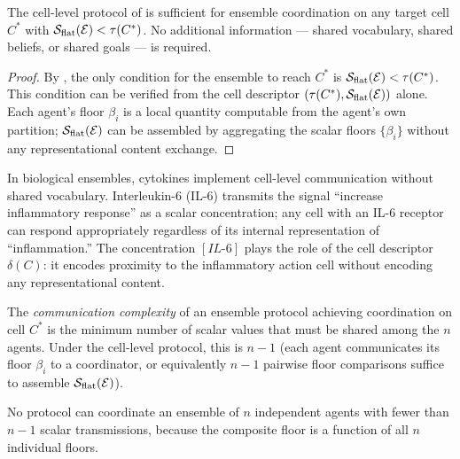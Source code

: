 \begin{proposition}
\label{prop:sufficient-communication}
The cell-level protocol of  is sufficient for
ensemble coordination on any target cell $C^*$ with $\mathcal{S}_{\mathrm{flat}}(\mathcal{E}) <
\tau(C^*)$.  No additional information — shared vocabulary, shared beliefs, or
shared goals — is required.
\end{proposition}

\begin{proof}
By , the only condition for the ensemble to reach
$C^*$ is $\mathcal{S}_{\mathrm{flat}}(\mathcal{E}) < \tau(C^*)$.  This condition can be
verified from the cell descriptor $(\tau(C^*), \mathcal{S}_{\mathrm{flat}}(\mathcal{E}))$
alone.  Each agent's floor $\beta_i$ is a local quantity computable from the
agent's own partition; $\mathcal{S}_{\mathrm{flat}}(\mathcal{E})$ can be assembled by
aggregating the scalar floors $\{\beta_i\}$ without any representational
content exchange.
\end{proof}

\begin{remark}
\label{rem:cytokine}
In biological ensembles, cytokines implement cell-level communication without
shared vocabulary.  Interleukin-6 (IL-6) transmits the signal ``increase
inflammatory response'' as a scalar concentration; any cell with an IL-6
receptor can respond appropriately regardless of its internal representation
of ``inflammation.''  The concentration $[IL\text{-}6]$ plays the role of the
cell descriptor $\delta(C)$: it encodes proximity to the inflammatory action
cell without encoding any representational content.
\end{remark}

\begin{definition}
\label{def:comm-complexity}
The \emph{communication complexity} of an ensemble protocol achieving
coordination on cell $C^*$ is the minimum number of scalar values that must
be shared among the $n$ agents.  Under the cell-level protocol, this is
$n - 1$ (each agent communicates its floor $\beta_i$ to a coordinator, or
equivalently $n-1$ pairwise floor comparisons suffice to assemble
$\mathcal{S}_{\mathrm{flat}}(\mathcal{E})$).
\end{definition}

\begin{proposition}
\label{prop:comm-lower-bound}
No protocol can coordinate an ensemble of $n$ independent agents with fewer
than $n - 1$ scalar transmissions, because the composite floor is a function
of all $n$ individual floors.
\end{proposition}

